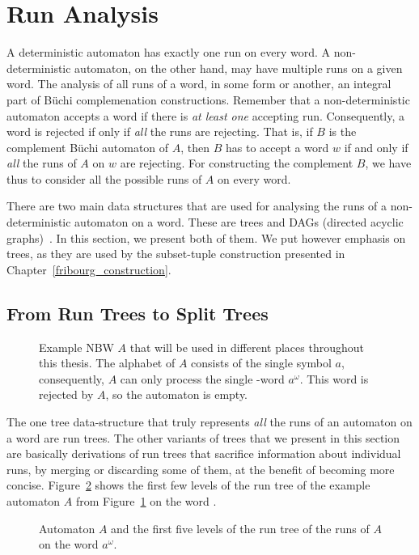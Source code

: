 \section{Run Analysis}
A deterministic automaton has exactly one run on every word. A non-deterministic automaton, on the other hand, may have multiple runs on a given word. The analysis of all runs of a word, in some form or another, an integral part of Büchi complemenation constructions. Remember that a non-deterministic automaton accepts a word if there is \emph{at least one} accepting run. Consequently, a word is rejected if only if \emph{all} the runs are rejecting. That is, if $B$ is the complement Büchi automaton of $A$, then $B$ has to accept a word $w$ if and only if \emph{all} the runs of $A$ on $w$ are rejecting. For constructing the complement $B$, we have thus to consider all the possible runs of $A$ on every word.

There are two main data structures that are used for analysing the runs of a non-deterministic automaton on a word. These are trees and DAGs (directed acyclic graphs)~\cite{2014_wilke}. In this section, we present both of them. We put however emphasis on trees, as they are used by the subset-tuple construction presented in Chapter~\ref{fribourg_construction}.

\subsection{From Run Trees to Split Trees}

\begin{figure}
\centering
\Automaton
\caption{Example NBW $A$ that will be used in different places throughout this thesis. The alphabet of $A$ consists of the single symbol $a$, consequently, $A$ can only process the single \om-word $a^\omega$. This word is rejected by $A$, so the automaton is empty.}
\label{automaton}
\end{figure}

The one tree data-structure that truly represents \emph{all} the runs of an automaton on a word are run trees. The other variants of trees that we present in this section are basically derivations of run trees that sacrifice information about individual runs, by merging or discarding some of them, at the benefit of becoming more concise. Figure~\ref{run_tree} shows the first few levels of the run tree of the example automaton $A$ from Figure~\ref{automaton} on the word \aom.

\begin{figure}
\centering
\RunTree
\caption{Automaton $A$ and the first five levels of the run tree of the runs of $A$ on the word $a^\omega$.}
\label{run_tree}
\end{figure}

